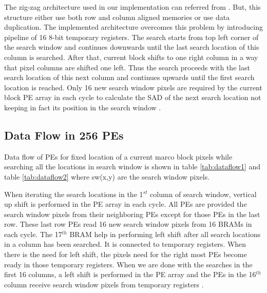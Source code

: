 The zig-zag architecture used in our implementation can referred from \cite{fast_vlsi_architecture}. But, this structure either use both row and column aligned memories or use data duplication. The implemented architecture overcomes this problem by introducing pipeline of 16 8-bit temporary registers. The search starts from top left corner of the search window and continues downwards until the last search location of this column is searched. After that, current block shifts to one right column in a way that pixel columns are shifted one left. Thus the search proceeds with the last search location of this next column and continues upwards until the first search location is reached. Only 16 new search window pixels are required by the current block PE array in each cycle to calculate the SAD of the next search location not keeping in fact its position in the search window \cite{kalaycioglu2011low}.


\subsection{Data Flow in 256 PEs}

Data flow of PEs for fixed location of a current marco block pixels while searching all the locations in search window is shown in table \ref{tab:dataflow1} and table \ref{tab:dataflow2} where sw(x,y) are the search window pixels.

When iterating the search locations in the 1$^{st}$ column of search window, vertical up shift is performed in the PE array in each cycle. All PEs are provided the search window pixels from their neighboring PEs except for those PEs in the last row. These last row PEs read 16 new search window pixels from 16 BRAMs in each cycle. The 17$^{th}$ BRAM help in performing left shift after all search locations in a column has been searched. It is connected to temporary registers. When there is the need for left shift, the pixels need for the right most PEs become ready in those temporary registers. When we are done with the searches in the first 16 columns, a left shift is performed in the PE array and the PEs in the 16$^{th}$ column receive search window pixels from temporary registers \cite{kalaycioglu2011low}.

